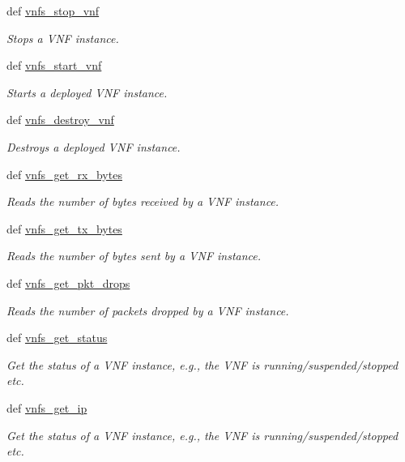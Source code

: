 \begin{DoxyCompactItemize}
def \hyperlink{classvnfs__operations_1_1VNFSOperations_a3c95617427fa157dbde8246a260546ed}{vnfs\-\_\-stop\-\_\-vnf}
\begin{DoxyCompactList}\small\item\em Stops a V\-N\-F instance. \end{DoxyCompactList}\item 
def \hyperlink{classvnfs__operations_1_1VNFSOperations_a1f88fc97d23ebfac8a99a71542ca5219}{vnfs\-\_\-start\-\_\-vnf}
\begin{DoxyCompactList}\small\item\em Starts a deployed V\-N\-F instance. \end{DoxyCompactList}\item 
def \hyperlink{classvnfs__operations_1_1VNFSOperations_a54389b0c8a5a740746816e3c99066685}{vnfs\-\_\-destroy\-\_\-vnf}
\begin{DoxyCompactList}\small\item\em Destroys a deployed V\-N\-F instance. \end{DoxyCompactList}\item 
def \hyperlink{classvnfs__operations_1_1VNFSOperations_a27409856538f49f14a8506635ded95b7}{vnfs\-\_\-get\-\_\-rx\-\_\-bytes}
\begin{DoxyCompactList}\small\item\em Reads the number of bytes received by a V\-N\-F instance. \end{DoxyCompactList}\item 
def \hyperlink{classvnfs__operations_1_1VNFSOperations_ab4617f4573ef7d6c4106b0fdbf728022}{vnfs\-\_\-get\-\_\-tx\-\_\-bytes}
\begin{DoxyCompactList}\small\item\em Reads the number of bytes sent by a V\-N\-F instance. \end{DoxyCompactList}\item 
def \hyperlink{classvnfs__operations_1_1VNFSOperations_a05a7ab8ae7e8a2ab7502a1d4e0113144}{vnfs\-\_\-get\-\_\-pkt\-\_\-drops}
\begin{DoxyCompactList}\small\item\em Reads the number of packets dropped by a V\-N\-F instance. \end{DoxyCompactList}\item 
def \hyperlink{classvnfs__operations_1_1VNFSOperations_ac2787ee33d5944c39a07321e270bdcfd}{vnfs\-\_\-get\-\_\-status}
\begin{DoxyCompactList}\small\item\em Get the status of a V\-N\-F instance, e.\-g., the V\-N\-F is running/suspended/stopped etc. \end{DoxyCompactList}\item 
def \hyperlink{classvnfs__operations_1_1VNFSOperations_a482dc96295584a1ca84300f04d000f26}{vnfs\-\_\-get\-\_\-ip}
\begin{DoxyCompactList}\small\item\em Get the status of a V\-N\-F instance, e.\-g., the V\-N\-F is running/suspended/stopped etc. \end{DoxyCompactList}\end{DoxyCompactItemize}
